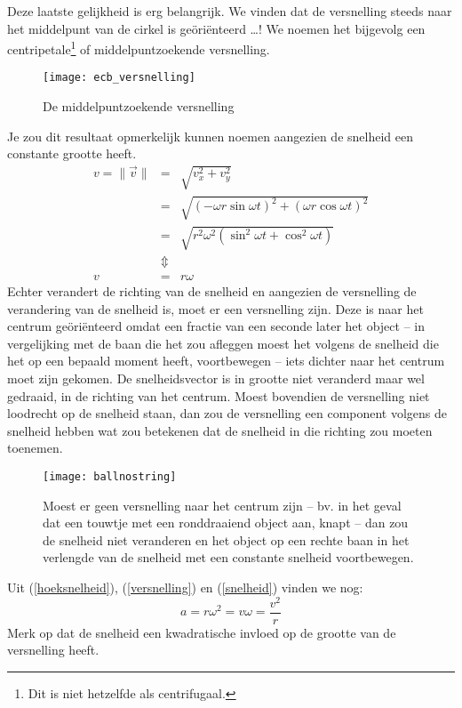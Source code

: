 Deze laatste gelijkheid is erg belangrijk. We vinden dat de versnelling steeds naar het middelpunt van de cirkel is ge\"ori\"enteerd \ldots! We noemen het bijgevolg een centripetale\footnote{Dit is niet hetzelfde als centrifugaal.} of middelpuntzoekende versnelling. 
\begin{figure}[h]
\centering
\texttt{[image: ecb\_versnelling]}
\caption{De middelpuntzoekende versnelling}
\end{figure}
Je zou dit resultaat opmerkelijk kunnen noemen aangezien de snelheid een constante grootte heeft.
\begin{eqnarray}
v=\parallel\vec{v}\parallel&=&\sqrt{v_x^2+v_y^2}\nonumber\\
&=&\sqrt{(-\omega r\sin\omega t)^2+(\omega r\cos\omega t)^2}\nonumber\\
&=&\sqrt{r^2\omega^2(\sin^2\omega t+\cos^2\omega t)}\nonumber\\
&\Updownarrow&\nonumber\\
v&=&r\omega\label{snelheid}
\end{eqnarray}
Echter verandert de richting van de snelheid en aangezien de versnelling de verandering van de snelheid is, moet er een versnelling zijn. Deze is naar het centrum ge\"ori\"enteerd omdat een fractie van een seconde later het object -- in vergelijking met de baan die het zou afleggen moest het volgens de snelheid die het op een bepaald moment heeft, voortbewegen -- iets dichter naar het centrum moet zijn gekomen. De snelheidsvector is in grootte niet veranderd maar wel gedraaid, in de richting van het centrum. Moest bovendien de versnelling niet loodrecht op de snelheid staan, dan zou de versnelling een component volgens de snelheid hebben wat zou betekenen dat de snelheid in die richting zou moeten toenemen.
\begin{figure}[h]
\centering
\texttt{[image: ballnostring]}
\caption{Moest er geen versnelling naar het centrum zijn -- bv. in het geval dat een touwtje met een ronddraaiend object aan, knapt -- dan zou de snelheid niet veranderen en het object op een rechte baan in het verlengde van de snelheid met een constante snelheid voortbewegen.}
\end{figure}

Uit (\ref{hoeksnelheid}), (\ref{versnelling}) en (\ref{snelheid}) vinden we nog:
\begin{equation}
a=r\omega^2=v\omega=\frac{v^2}{r}
\end{equation}
Merk op dat de snelheid een kwadratische invloed op de grootte van de versnelling heeft.

